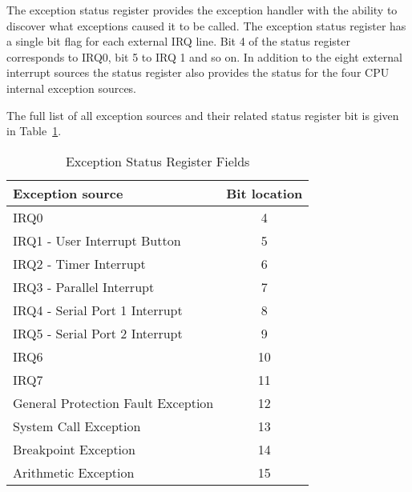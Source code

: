 \documentclass[a4paper,10pt]{article}
\begin{document}
The exception status register provides the exception handler with the
ability to discover what exceptions caused it to be called. The
exception status register has a single bit flag for each external IRQ
line. Bit 4 of the status register corresponds to IRQ0, bit 5 to IRQ 1
and so on. In addition to the eight external interrupt sources the
status register also provides the status for the four CPU internal
exception sources.

The full list of all exception sources and their related status
register bit is given in Table~\ref{table:sta_loc}.

\begin{table}[h]
\begin{center}
\begin{tabular}{|l|c|}
\hline
\textbf{Exception source} & \textbf{Bit location} \\
\hline
IRQ0 & 4 \\
\hline
IRQ1 - User Interrupt Button & 5 \\
\hline
IRQ2 - Timer Interrupt & 6 \\
\hline
IRQ3 - Parallel Interrupt & 7 \\
\hline
IRQ4 - Serial Port 1 Interrupt & 8 \\
\hline
IRQ5 - Serial Port 2 Interrupt & 9 \\
\hline
IRQ6 & 10 \\
\hline
IRQ7 & 11 \\
\hline
General Protection Fault Exception & 12 \\
\hline
System Call Exception & 13 \\
\hline
Breakpoint Exception & 14 \\
\hline
Arithmetic Exception & 15 \\
\hline
\end{tabular}
\caption{Exception Status Register Fields}
\label{table:sta_loc}
\end{center}
\end{table}
\end{document}
